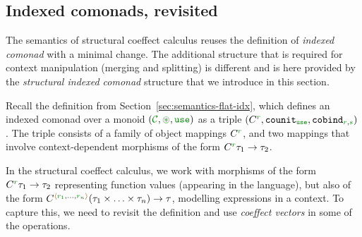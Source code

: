
\subsection{Indexed comonads, revisited}

The semantics of structural coeffect calculus reuses the definition of \emph{indexed comonad} with
a minimal change. The additional structure that is required for context manipulation (merging and
splitting) is different and is here provided by the \emph{structural indexed comonad} structure that
we introduce in this section.

Recall the definition from Section~\ref{sec:semantics-flat-idx}, which defines an indexed como\-nad
over a monoid $(\C, \cseq, \cunit)$ as a triple $(\ctyp{\cclrd{r}{}}, \ident{counit}_{\cunit},
\ident{cobind}_{\cclrd{r}, \cclrd{s}})$. The triple consists of a family of object mappings $\ctyp{\cclrd{r}{}}$,
and two mappings that involve context-dependent morphisms of the form $\ctyp{\cclrd{r}} \tau_1 \rightarrow \tau_2$.

In the structural coeffect calculus, we work with morphisms of the form $\ctyp{\cclrd{r}} \tau_1 \rightarrow \tau_2$
representing function values (appearing in the language), but also of the form
$\ctyp{\alift{\cclrd{r_1},\ldots,\cclrd{r_n}}}{(\tau_1 \times \ldots \times \tau_n)} \rightarrow \tau$,
modelling expressions in a context. To capture this, we need to revisit the definition and use
\emph{coeffect vectors} in some of the operations.

